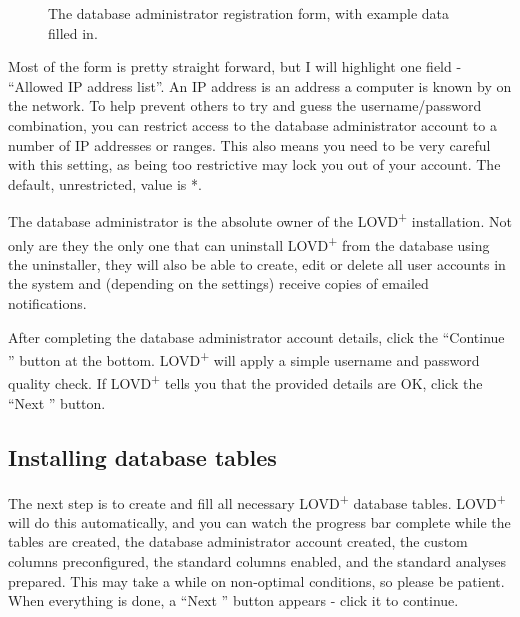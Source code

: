 \begin{figure}[ht]
  \begin{shaded}
  \caption{The database administrator registration form, with example data filled in.}
  \end{shaded}
\end{figure}

Most of the form is pretty straight forward, but I will highlight one field - ``Allowed IP address list''.
An IP address is an address a computer is known by on the network.
To help prevent others to try and guess the username/password combination,
 you can restrict access to the database administrator account to a number of IP addresses or ranges.
This also means you need to be very careful with this setting,
 as being too restrictive may lock you out of your account.
The default, unrestricted, value is *.

\begin{infotable}
The database administrator is the absolute owner of the LOVD\textsuperscript{+} installation.
Not only are they the only one that can uninstall LOVD\textsuperscript{+} from the database using the uninstaller,
 they will also be able to create, edit or delete all user accounts in the system and
 (depending on the settings) receive copies of emailed notifications.
\end{infotable}

\noindent
After completing the database administrator account details,
 click the ``Continue \guillemotright'' button at the bottom.
LOVD\textsuperscript{+} will apply a simple username and password quality check.
If LOVD\textsuperscript{+} tells you that the provided details are OK, click the ``Next \guillemotright'' button.



\subsection{Installing database tables}
The next step is to create and fill all necessary LOVD\textsuperscript{+} database tables.
LOVD\textsuperscript{+} will do this automatically,
 and you can watch the progress bar complete while the tables are created,
 the database administrator account created, the custom columns preconfigured,
 the standard columns enabled, and the standard analyses prepared.
This may take a while on non-optimal conditions, so please be patient.
When everything is done, a ``Next \guillemotright'' button appears - click it to continue.

